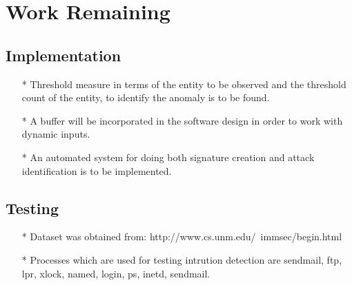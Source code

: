 \section{Work Remaining}

\subsection{Implementation}

\begin{itemize}
    \item[*] Threshold measure in terms of the entity to be observed and the threshold count of the entity, to identify the anomaly is to be found.
    \item[*] A buffer will be incorporated in the software design in order to work with dynamic inputs.
    \item[*] An automated system for doing both signature creation and attack identification is to be implemented.
\end{itemize}

\subsection{Testing}

    \begin{itemize}
        \item[*] Dataset was obtained from: http://www.cs.unm.edu/~immsec/begin.html
        \item[*] Processes which are used for testing intrution detection are sendmail, ftp, lpr, xlock, named, login, ps, inetd, sendmail.
    \end{itemize}
